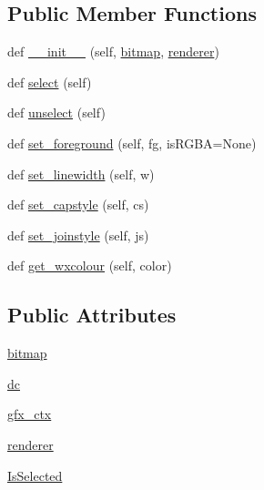 \subsection*{Public Member Functions}
\begin{DoxyCompactItemize}
\item 
def \hyperlink{classmatplotlib_1_1backends_1_1backend__wx_1_1GraphicsContextWx_a7b4313654f83ca9ac33eba0c54287033}{\+\_\+\+\_\+init\+\_\+\+\_\+} (self, \hyperlink{classmatplotlib_1_1backends_1_1backend__wx_1_1GraphicsContextWx_a370d510585ed6f61730dafb80c3bd0ae}{bitmap}, \hyperlink{classmatplotlib_1_1backends_1_1backend__wx_1_1GraphicsContextWx_a88d17992a26fec774d73446719e7d44e}{renderer})
\item 
def \hyperlink{classmatplotlib_1_1backends_1_1backend__wx_1_1GraphicsContextWx_a7a32c6e17ffbd23a055c164e0987bb76}{select} (self)
\item 
def \hyperlink{classmatplotlib_1_1backends_1_1backend__wx_1_1GraphicsContextWx_a5138cf41e8ace3669d94d3b111c0a2fa}{unselect} (self)
\item 
def \hyperlink{classmatplotlib_1_1backends_1_1backend__wx_1_1GraphicsContextWx_a5164419d76000c904ae57ff7cf292ca3}{set\+\_\+foreground} (self, fg, is\+R\+G\+BA=None)
\item 
def \hyperlink{classmatplotlib_1_1backends_1_1backend__wx_1_1GraphicsContextWx_ab7f4b5a6717c4d10d5dd93a3ae87bf0a}{set\+\_\+linewidth} (self, w)
\item 
def \hyperlink{classmatplotlib_1_1backends_1_1backend__wx_1_1GraphicsContextWx_a0a76a337b699f191cd56f84b392a6183}{set\+\_\+capstyle} (self, cs)
\item 
def \hyperlink{classmatplotlib_1_1backends_1_1backend__wx_1_1GraphicsContextWx_a0e6b3ef07ef1faf99fff4d4c89d7d44e}{set\+\_\+joinstyle} (self, js)
\item 
def \hyperlink{classmatplotlib_1_1backends_1_1backend__wx_1_1GraphicsContextWx_af01aed5b5c979ca88dac8e468044f9ab}{get\+\_\+wxcolour} (self, color)
\end{DoxyCompactItemize}
\subsection*{Public Attributes}
\begin{DoxyCompactItemize}
\item 
\hyperlink{classmatplotlib_1_1backends_1_1backend__wx_1_1GraphicsContextWx_a370d510585ed6f61730dafb80c3bd0ae}{bitmap}
\item 
\hyperlink{classmatplotlib_1_1backends_1_1backend__wx_1_1GraphicsContextWx_a610ffd4265318b2ccbeb8ad44bbde3b9}{dc}
\item 
\hyperlink{classmatplotlib_1_1backends_1_1backend__wx_1_1GraphicsContextWx_aba2aefd5dff1fe8688856599ffd7615a}{gfx\+\_\+ctx}
\item 
\hyperlink{classmatplotlib_1_1backends_1_1backend__wx_1_1GraphicsContextWx_a88d17992a26fec774d73446719e7d44e}{renderer}
\item 
\hyperlink{classmatplotlib_1_1backends_1_1backend__wx_1_1GraphicsContextWx_acc2b5e71d7657129a14d082aa441cc4c}{Is\+Selected}
\end{DoxyCompactItemize}


